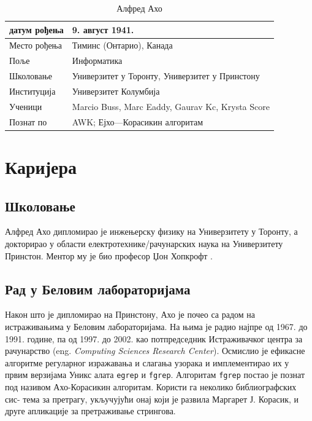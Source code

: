 \documentclass[a4paper]{article}
\begin{document}
\begin{table}[h!]
\begin{center}
\caption{Алфред Ахо}
\begin{tabular}{|l|l|} \hline
датум рођења& 9. август 1941.\\ \hline
Место рођења &Тиминс (Онтарио), Канада\\ \hline
Поље &Информатика\\ \hline
Школовање &Универзитет у Торонту, Универзитет у Принстону\\ \hline
Институција &Универзитет Колумбија\\ \hline
Ученици &Marcio Buss, Marc Eaddy, Gaurav Kc, Krysta Score\\ \hline
Познат по &AWK; Ејхо—Корасикин алгоритам\\ \hline

\end{tabular}
\label{tab:tabela1}
\end{center}
\end{table}

\newpage

\section{Каријера}
\label{sec:naslov1}
\subsection{Школовање}
\label{subsec:podnaslov1}

Алфред Ахо дипломирао је инжењерску физику на Универзитету у Торонту, а  докторирао у области електротехнике/рачунарских наука на Универзитету Принстон. Ментор му је био професор Џон Хопкрофт \cite{johnh}.

\subsection{Рад у Беловим лабораторијама}
\label{subsec:podnaslov2}
Након што је дипломирао на Принстону, Ахо је почео са радом на истраживањима у Беловим лабораторијама. На њима је радио најпре од 1967. до 1991. године, па од 1997. до 2002. као потпредседник Истраживачког центра за рачунарство (eng. \emph{Computing Sciences Research Center}). Осмислио је ефикасне алгоритме регуларног изражавања и слагања узорака и имплементирао их у првим верзијама Уникс алата \verb|egrep| и \verb|fgrep|. Алгоритам \verb|fgrep| постао је познат под називом Ахо-Корасикин алгоритам. Користи га неколико библиографских сис-
тема за претрагу, укључујући онај који је развила Маргарет Ј. Корасик, и друге апликације за претраживање стрингова. 
\end{document}
